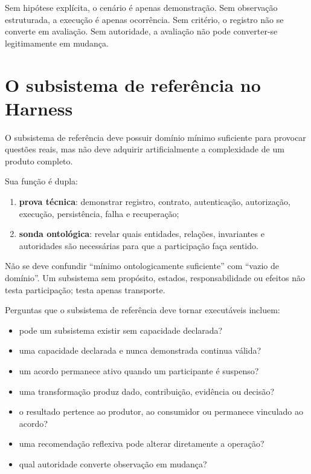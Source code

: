 \documentclass[11pt,a4paper,oneside]{article}
\begin{document}
Sem hipótese explícita, o cenário é apenas demonstração. Sem observação estruturada, a execução é apenas ocorrência. Sem critério, o registro não se converte em avaliação. Sem autoridade, a avaliação não pode converter-se legitimamente em mudança.

\section{O subsistema de referência no Harness}

O subsistema de referência deve possuir domínio mínimo suficiente para provocar questões reais, mas não deve adquirir artificialmente a complexidade de um produto completo.

Sua função é dupla:

\begin{enumerate}
  \item \textbf{prova técnica}: demonstrar registro, contrato, autenticação, autorização, execução, persistência, falha e recuperação;
  \item \textbf{sonda ontológica}: revelar quais entidades, relações, invariantes e autoridades são necessárias para que a participação faça sentido.
\end{enumerate}

\begin{alerta}
Não se deve confundir ``mínimo ontologicamente suficiente'' com ``vazio de domínio''. Um subsistema sem propósito, estados, responsabilidade ou efeitos não testa participação; testa apenas transporte.
\end{alerta}

Perguntas que o subsistema de referência deve tornar executáveis incluem:

\begin{itemize}
  \item pode um subsistema existir sem capacidade declarada?
  \item uma capacidade declarada e nunca demonstrada continua válida?
  \item um acordo permanece ativo quando um participante é suspenso?
  \item uma transformação produz dado, contribuição, evidência ou decisão?
  \item o resultado pertence ao produtor, ao consumidor ou permanece vinculado ao acordo?
  \item uma recomendação reflexiva pode alterar diretamente a operação?
  \item qual autoridade converte observação em mudança?
\end{itemize}
\end{document}
